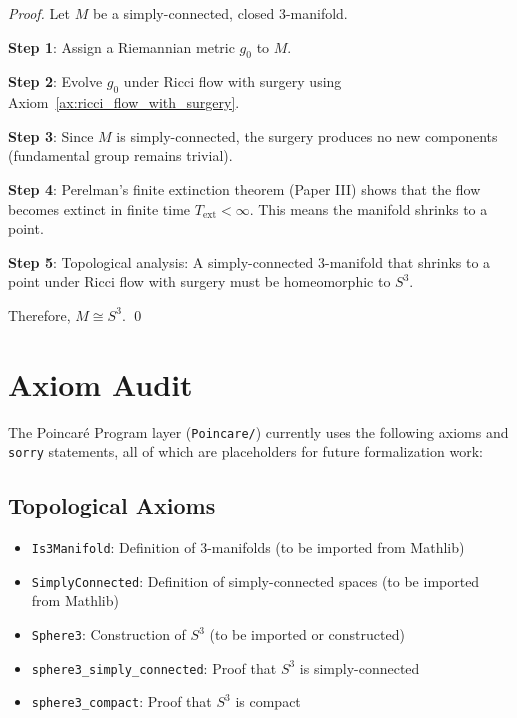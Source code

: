\begin{proof}
Let $M$ be a simply-connected, closed 3-manifold.

\textbf{Step 1}: Assign a Riemannian metric $g_0$ to $M$.

\textbf{Step 2}: Evolve $g_0$ under Ricci flow with surgery using Axiom~\ref{ax:ricci_flow_with_surgery}.

\textbf{Step 3}: Since $M$ is simply-connected, the surgery produces no new components (fundamental group remains trivial).

\textbf{Step 4}: Perelman's finite extinction theorem (Paper III) shows that the flow becomes extinct in finite time $T_{\text{ext}} < \infty$. This means the manifold shrinks to a point.

\textbf{Step 5}: Topological analysis: A simply-connected 3-manifold that shrinks to a point under Ricci flow with surgery must be homeomorphic to $S^3$.

Therefore, $M \cong S^3$. \qed
\end{proof}

\chapter{Axiom Audit}
\label{chap:axiom_audit}

The Poincaré Program layer (\texttt{Poincare/}) currently uses the following axioms and \texttt{sorry} statements, all of which are placeholders for future formalization work:

\section{Topological Axioms}
\begin{itemize}
\item \texttt{Is3Manifold}: Definition of 3-manifolds (to be imported from Mathlib)
\item \texttt{SimplyConnected}: Definition of simply-connected spaces (to be imported from Mathlib)
\item \texttt{Sphere3}: Construction of $S^3$ (to be imported or constructed)
\item \texttt{sphere3\_simply\_connected}: Proof that $S^3$ is simply-connected
\item \texttt{sphere3\_compact}: Proof that $S^3$ is compact
\end{itemize}

